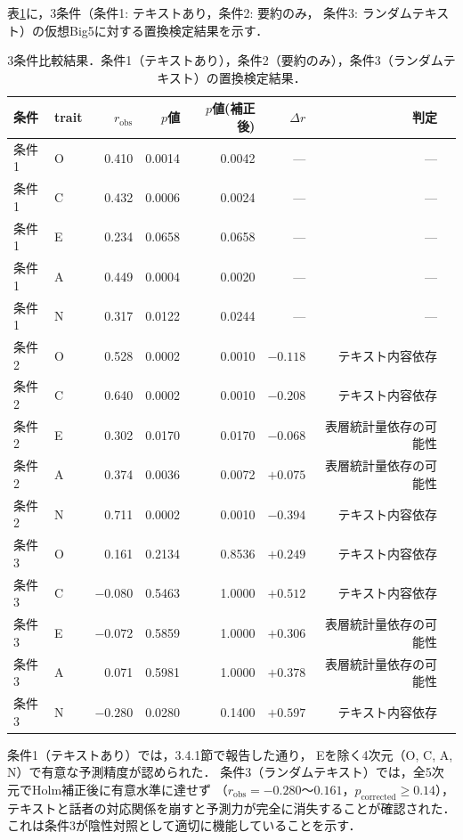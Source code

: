 \documentclass[dvipdfmx,11pt,a4paper]{bxjsarticle}
\renewcommand{\_}{\paperorigunderscore\allowbreak}%
\begin{document}
表\ref{tab:baseline_comparison}に，3条件（条件1: テキストあり，条件2: 要約のみ，
条件3: ランダムテキスト）の仮想Big5に対する置換検定結果を示す．

\begin{table}[htbp]
\centering
\caption{3条件比較結果．条件1（テキストあり），条件2（要約のみ），条件3（ランダムテキスト）の置換検定結果．}
\label{tab:baseline_comparison}
\begin{tabular}{llrrrrrl}
\toprule
条件 & trait & $r_{\text{obs}}$ & $p$値 & $p$値(補正後) & $\Delta r$ & 判定 \\
\midrule
条件1 & O & 0.410 & 0.0014 & 0.0042 & --- & --- \\
条件1 & C & 0.432 & 0.0006 & 0.0024 & --- & --- \\
条件1 & E & 0.234 & 0.0658 & 0.0658 & --- & --- \\
条件1 & A & 0.449 & 0.0004 & 0.0020 & --- & --- \\
条件1 & N & 0.317 & 0.0122 & 0.0244 & --- & --- \\
\midrule
条件2 & O & 0.528 & 0.0002 & 0.0010 & $-0.118$ & テキスト内容依存 \\
条件2 & C & 0.640 & 0.0002 & 0.0010 & $-0.208$ & テキスト内容依存 \\
条件2 & E & 0.302 & 0.0170 & 0.0170 & $-0.068$ & 表層統計量依存の可能性 \\
条件2 & A & 0.374 & 0.0036 & 0.0072 & $+0.075$ & 表層統計量依存の可能性 \\
条件2 & N & 0.711 & 0.0002 & 0.0010 & $-0.394$ & テキスト内容依存 \\
\midrule
条件3 & O & 0.161 & 0.2134 & 0.8536 & $+0.249$ & テキスト内容依存 \\
条件3 & C & $-0.080$ & 0.5463 & 1.0000 & $+0.512$ & テキスト内容依存 \\
条件3 & E & $-0.072$ & 0.5859 & 1.0000 & $+0.306$ & 表層統計量依存の可能性 \\
条件3 & A & 0.071 & 0.5981 & 1.0000 & $+0.378$ & 表層統計量依存の可能性 \\
条件3 & N & $-0.280$ & 0.0280 & 0.1400 & $+0.597$ & テキスト内容依存 \\
\bottomrule
\end{tabular}
\end{table}

条件1（テキストあり）では，3.4.1節で報告した通り，
Eを除く4次元（O, C, A, N）で有意な予測精度が認められた．
条件3（ランダムテキスト）では，全5次元でHolm補正後に有意水準に達せず
（$r_{\text{obs}} = -0.280$〜$0.161$，$p_{\text{corrected}} \geq 0.14$），
テキストと話者の対応関係を崩すと予測力が完全に消失することが確認された．
これは条件3が陰性対照として適切に機能していることを示す．
\end{document}
